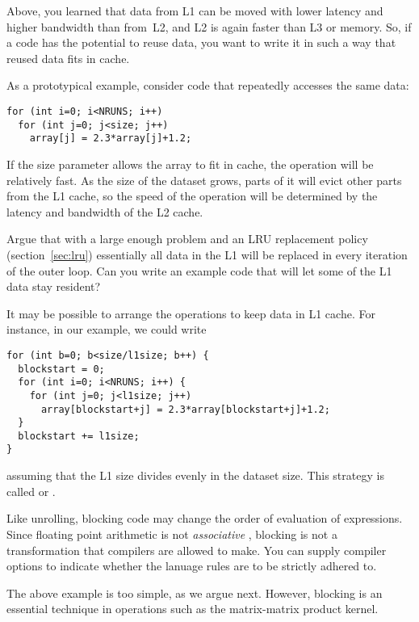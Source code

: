 
Above, you learned that data from L1 can be moved with lower latency
and higher bandwidth than from~L2, and L2 is again faster than L3 or memory.
So, if a code has the potential to reuse data,
you want to write it in such a way that reused data fits in cache.

As a prototypical example, consider code that repeatedly accesses the same data:
\begin{lstlisting}
for (int i=0; i<NRUNS; i++)
  for (int j=0; j<size; j++)
    array[j] = 2.3*array[j]+1.2;
\end{lstlisting}
If the size parameter allows the array to fit in cache, the operation
will be relatively fast. As the size of the dataset grows, parts of it
will evict other parts from the L1 cache, so the speed of the
operation will be determined by the latency and bandwidth of the L2
cache.

\begin{exercise}
  Argue that with a large enough problem and an \ac{LRU} replacement policy
  (section~\ref{sec:lru}) essentially all data in the L1 will be
  replaced in every iteration of the outer loop. Can you write an
  example code that will let some of the L1 data stay resident?
\end{exercise}

It may be possible to arrange the operations to keep data in L1 cache.
For instance, in our example, we could write
\begin{lstlisting}
for (int b=0; b<size/l1size; b++) {
  blockstart = 0;
  for (int i=0; i<NRUNS; i++) {
    for (int j=0; j<l1size; j++)
      array[blockstart+j] = 2.3*array[blockstart+j]+1.2; 
  }
  blockstart += l1size;
}
\end{lstlisting}
assuming that the L1 size divides evenly in the dataset size.
This strategy is called  or
.

\begin{remark}
  Like unrolling, blocking code may change the order of evaluation of expressions.
  Since floating point arithmetic is not
  \emph{associative}%
  ,
  blocking is not a transformation that compilers are allowed to make.
  You can supply compiler options to indicate whether the lanuage
  rules are to be strictly adhered to.
\end{remark}

The above example is too simple, as we argue next.
However, blocking is an essential technique
in operations such as the matrix-matrix product kernel.

